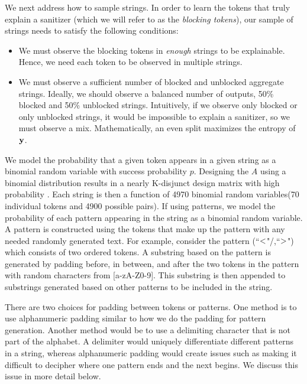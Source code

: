 We next address how to sample strings. In order to learn the tokens that truly explain a sanitizer (which we will refer to as the \emph{blocking tokens}), our sample of strings needs to satisfy the following conditions: 
\begin{itemize}
	\item We must observe the blocking tokens in \emph{enough} strings to be explainable. Hence, we need each token to be observed in multiple strings. 
	\item We must observe a sufficient number of blocked and unblocked aggregate strings. Ideally, we should observe a balanced number of outputs, 50\% blocked and 50\% unblocked strings. Intuitively, if we observe only blocked or only unblocked strings, it would be impossible to explain a sanitizer, so we must observe a mix. Mathematically, an even split maximizes the entropy of $\mathbf{y}$.	
\end{itemize} 
We model the probability that a given token appears in a given string as a binomial random variable with success probability $p$. Designing the $A$ using a binomial distribution results in a nearly K-disjunct design matrix with high probability \cite{Malyutov78}. Each string is then a function of 4970 binomial random variables(70 individual tokens and 4900 possible pairs). If using patterns, we model the probability of each pattern appearing in the string as a binomial random variable. A pattern is constructed using the tokens that make up the pattern with any needed randomly generated text.  For example, consider the pattern (``$\sf{<}$"/,``$\sf{>}$") which consists of two ordered tokens. A substring based on the pattern is generated by padding before, in between, and after the two tokens in the pattern with random characters from [a-zA-Z0-9]. This substring is then appended to substrings generated based on other patterns to be included in the string. 

There are two choices for padding between tokens or patterns. One method is to use alphanumeric padding similar to how we do the padding for pattern generation. Another method would be to use a delimiting character that is not part of the alphabet. A delimiter would uniquely differentiate different patterns in a string, whereas alphanumeric padding would create issues such as making it difficult to decipher where one pattern ends and the next begins. We discuss this issue in more detail below.

